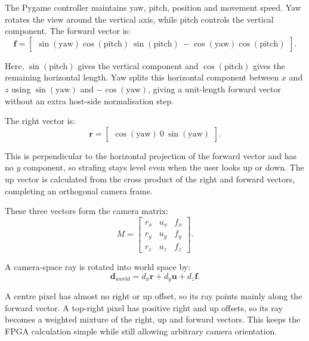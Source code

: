 The Pygame controller maintains yaw, pitch, position and movement speed. Yaw rotates the view around the vertical axis, while pitch controls the vertical component. The forward vector is:
\begin{equation}
\mathbf{f} =
\begin{bmatrix}
\sin(\text{yaw})\cos(\text{pitch}) \
\sin(\text{pitch}) \
-\cos(\text{yaw})\cos(\text{pitch})
\end{bmatrix}.
\end{equation}

Here, $\sin(\text{pitch})$ gives the vertical component and $\cos(\text{pitch})$ gives the remaining horizontal length. Yaw splits this horizontal component between $x$ and $z$ using $\sin(\text{yaw})$ and $-\cos(\text{yaw})$, giving a unit-length forward vector without an extra host-side normalisation step.

The right vector is:
\begin{equation}
\mathbf{r} =
\begin{bmatrix}
\cos(\text{yaw}) \
0 \
\sin(\text{yaw})
\end{bmatrix}.
\end{equation}

This is perpendicular to the horizontal projection of the forward vector and has no $y$ component, so strafing stays level even when the user looks up or down. The up vector is calculated from the cross product of the right and forward vectors, completing an orthogonal camera frame.

These three vectors form the camera matrix:
\begin{equation}
M =
\begin{bmatrix}
r_x & u_x & f_x \\
r_y & u_y & f_y \\
r_z & u_z & f_z
\end{bmatrix}.
\end{equation}

A camera-space ray is rotated into world space by:
\begin{equation}
\mathbf{d}_{world}=d_x\mathbf{r}+d_y\mathbf{u}+d_z\mathbf{f}.
\end{equation}

A centre pixel has almost no right or up offset, so its ray points mainly along the forward vector. A top-right pixel has positive right and up offsets, so its ray becomes a weighted mixture of the right, up and forward vectors. This keeps the FPGA calculation simple while still allowing arbitrary camera orientation.

